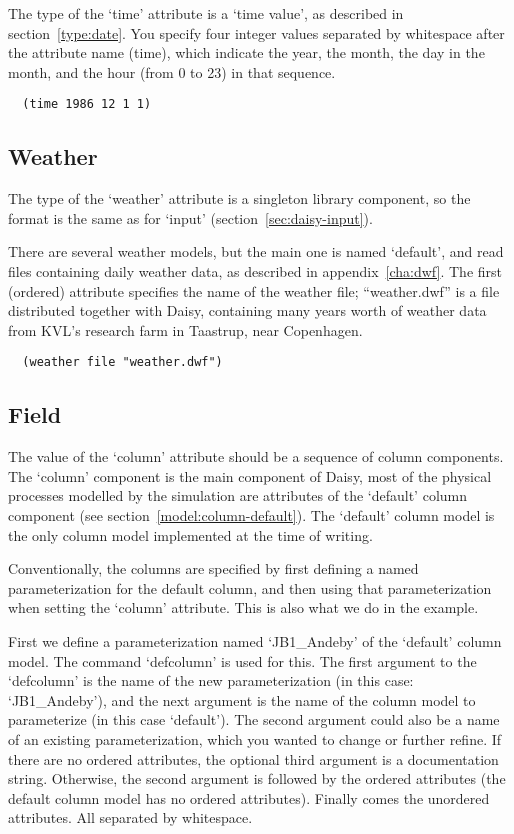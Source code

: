 The type of the `time' attribute is a `time value', as described in
section~\ref{type:date}.  You specify four integer values separated by
whitespace after the attribute name (time), which indicate the year,
the month, the day in the month, and the hour (from 0 to 23) in that
sequence.  

\begin{verbatim}
  (time 1986 12 1 1)
\end{verbatim}


\subsection{Weather}
\label{sec:weather}

The type of the `weather' attribute is a singleton library component,
so the format is the same as for `input'
(section~\ref{sec:daisy-input}).

There are several weather models, but the main one is named `default',
and read files containing daily weather data, as described in
appendix~\ref{cha:dwf}.  The first (ordered) attribute specifies the
name of the weather file; ``weather.dwf'' is a file distributed
together with Daisy, containing many years worth of weather data from
KVL's research farm in Taastrup, near Copenhagen.

\begin{verbatim}
  (weather file "weather.dwf")
\end{verbatim}

\subsection{Field}
\label{sec:column}

The value of the `column' attribute should be a sequence of column
components.  The `column' component is the main component of Daisy,
most of the physical processes modelled by the simulation are
attributes of the `default' column component (see
section~\ref{model:column-default}).  The `default' column model is
the only column model implemented at the time of writing.

Conventionally, the columns are specified by first defining a named
parameterization for the default column, and then using that
parameterization when setting the `column' attribute.  This is also
what we do in the example.

First we define a parameterization named `JB1\_Andeby' of the
`default' column model.  The command `defcolumn' is used for this.
The first argument to the `defcolumn' is the name of the new
parameterization (in this case: `JB1\_Andeby'), and the next argument
is the name of the column model to parameterize (in this case
`default').  The second argument could also be a name of an existing
parameterization, which you wanted to change or further refine.  If
there are no ordered attributes, the optional third argument is a
documentation string.  Otherwise, the second argument is followed by
the ordered attributes (the default column model has no ordered
attributes).  Finally comes the unordered attributes.  All separated
by whitespace.

